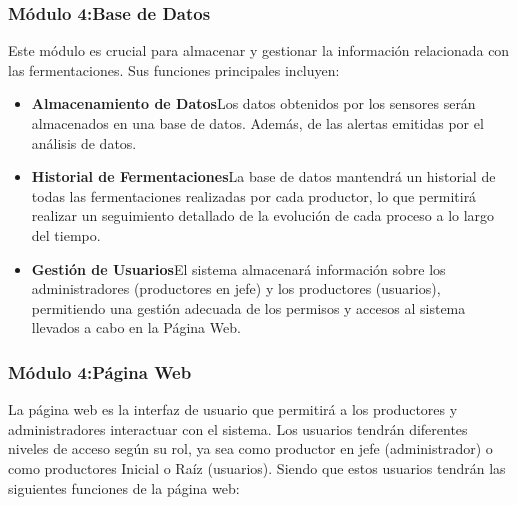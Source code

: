 \subsubsection{Módulo 4:Base de Datos}
Este módulo es crucial para almacenar y gestionar la información relacionada con
las fermentaciones. Sus funciones principales incluyen:
\begin{itemize}
    \item \textbf{Almacenamiento de Datos}Los datos obtenidos por los sensores serán
    almacenados en una base de datos. Además, de las alertas emitidas por el
    análisis de datos.
    \item \textbf{Historial de Fermentaciones}La base de datos mantendrá un historial de
    todas las fermentaciones realizadas por cada productor, lo que permitirá
    realizar un seguimiento detallado de la evolución de cada proceso a lo largo
    del tiempo.
    \item \textbf{Gestión de Usuarios}El sistema almacenará información sobre los
    administradores (productores en jefe) y los productores (usuarios),
    permitiendo una gestión adecuada de los permisos y accesos al sistema
    llevados a cabo en la Página Web.
\end{itemize}
\subsubsection{Módulo 4:Página Web}
La página web es la interfaz de usuario que permitirá a los productores y
administradores interactuar con el sistema. Los usuarios tendrán diferentes niveles
de acceso según su rol, ya sea como productor en jefe (administrador) o como
productores Inicial o Raíz (usuarios). Siendo que estos usuarios tendrán las
siguientes funciones de la página web:
